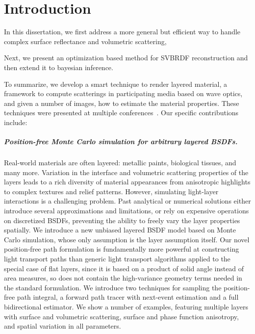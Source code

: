 \chapter{Introduction}
\label{cpt:introduction}

In this dissertation, we first address a more general but efficient way to handle complex surface reflectance and volumetric scattering, 


Next, we present an optimization based method for SVBRDF reconstruction and then extend it to bayesian inference.

To summarize, we develop a smart technique to render layered material, a framework to compute scatterings in participating media based on wave optics, and given a number of images, how to estimate the material properties. 
These techniques were presented at multiple conferences~\cite{guo2018position, guo2020materialgan, guo2020bayesian}. Our specific contributions include:

\paragraph{Position-free Monte Carlo simulation for arbitrary layered BSDFs.}
Real-world materials are often layered: metallic paints, biological tissues, and many more. Variation in the interface and volumetric scattering properties of the layers leads to a rich diversity of material appearances from anisotropic highlights to complex textures and relief patterns. However, simulating light-layer interactions is a challenging problem. Past analytical or numerical solutions either introduce several approximations and limitations, or rely on expensive operations on discretized BSDFs, preventing the ability to freely vary the layer properties spatially. We introduce a new unbiased layered BSDF model based on Monte Carlo simulation, whose only assumption is the layer assumption itself. Our novel position-free path formulation is fundamentally more powerful at constructing light transport paths than generic light transport algorithms applied to the special case of flat layers, since it is based on a product of solid angle instead of area measures, so does not contain the high-variance geometry terms needed in the standard formulation. We introduce two techniques for sampling the position-free path integral, a forward path tracer with next-event estimation and a full bidirectional estimator. We show a number of examples, featuring multiple layers with surface and volumetric scattering, surface and phase function anisotropy, and spatial variation in all parameters.